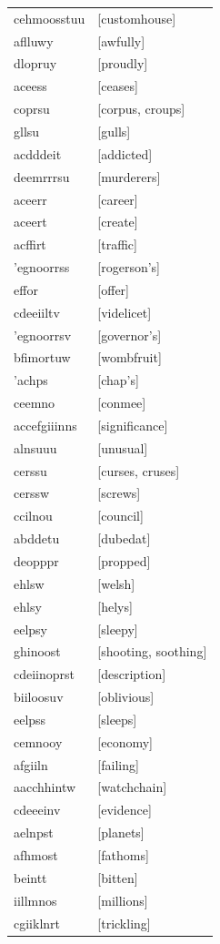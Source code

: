 \documentclass{article}
\begin{document}
\begin{tabular}{ll}
cehmoosstuu & [customhouse] \\
aflluwy & [awfully] \\
dlopruy & [proudly] \\
aceess & [ceases] \\
coprsu & [corpus, croups] \\
gllsu & [gulls] \\
acdddeit & [addicted] \\
deemrrrsu & [murderers] \\
aceerr & [career] \\
aceert & [create] \\
acffirt & [traffic] \\
'egnoorrss & [rogerson's] \\
effor & [offer] \\
cdeeiiltv & [videlicet] \\
'egnoorrsv & [governor's] \\
bfimortuw & [wombfruit] \\
'achps & [chap's] \\
ceemno & [conmee] \\
accefgiiinns & [significance] \\
alnsuuu & [unusual] \\
cerssu & [curses, cruses] \\
cerssw & [screws] \\
ccilnou & [council] \\
abddetu & [dubedat] \\
deopppr & [propped] \\
ehlsw & [welsh] \\
ehlsy & [helys] \\
eelpsy & [sleepy] \\
ghinoost & [shooting, soothing] \\
cdeiinoprst & [description] \\
biiloosuv & [oblivious] \\
eelpss & [sleeps] \\
cemnooy & [economy] \\
afgiiln & [failing] \\
aacchhintw & [watchchain] \\
cdeeeinv & [evidence] \\
aelnpst & [planets] \\
afhmost & [fathoms] \\
beintt & [bitten] \\
iillmnos & [millions] \\
cgiiklnrt & [trickling] \\

\end{tabular}
\end{document}
